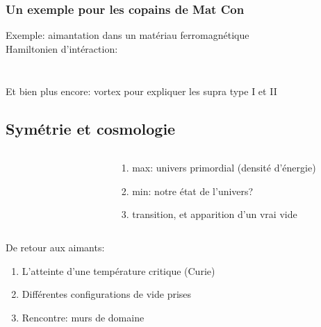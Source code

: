 \documentclass[handout]{beamer}
\begin{document}
\begin{frame}
\frametitle{Un exemple pour les copains de Mat Con}
Exemple: aimantation dans un matériau ferromagnétique \\
Hamiltonien d'intéraction: 
\begin{columns}
    \begin{column}{.5\linewidth}
   \begin{figure}[0.3\textwidth]
    \end{figure}
    \end{column}
    \begin{column}{.5\linewidth}
    \begin{figure}[0.3\textwidth]
    \end{figure}
    \end{column}
  \end{columns}
Et bien plus encore: vortex pour expliquer les supra type I et II
\end{frame}

\subsection{Symétrie et cosmologie}
\begin{columns}
    \begin{column}{.5\linewidth}
   \begin{figure}[0.3\textwidth]
    \end{figure}
    \end{column}
    \begin{column}{.5\linewidth}
    \begin{enumerate}
    \item max: univers primordial (densité d'énergie)
    \item min: notre état de l'univers?
    \item transition, et apparition d'un vrai vide
    \end{enumerate}
    \end{column}
  \end{columns}
  
\begin{columns}
\begin{column}{.5\linewidth}
De retour aux aimants:
    \begin{enumerate}
    \item L'atteinte d'une température critique (Curie)
    \item Différentes configurations de vide prises
    \item Rencontre: murs de domaine
    \end{enumerate}
    \end{column}
	\begin{column}{.5\linewidth}
    \begin{figure}[0.3\textwidth]
    \end{figure}
	\end{column}
	
\end{columns}
\end{document}
